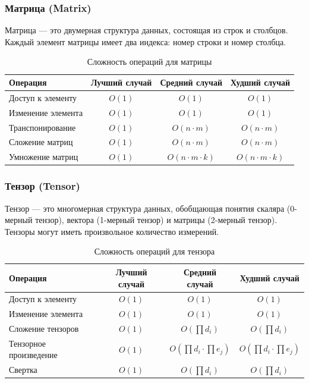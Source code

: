 \documentclass[a4paper,12pt]{article}
\begin{document}
\subsubsection{Матрица (Matrix)}
\label{subsubsec:матрица-matrix}

Матрица --- это двумерная структура данных, состоящая из строк и столбцов. Каждый элемент матрицы имеет два индекса: номер строки и номер столбца.

\begin{table}[H]
    \centering
    \begin{tabular}{|l|c|c|c|}
        \hline
        Операция & Лучший случай & Средний случай & Худший случай \\
        \hline
        Доступ к элементу & $O(1)$ & $O(1)$ & $O(1)$ \\
        \hline
        Изменение элемента & $O(1)$ & $O(1)$ & $O(1)$ \\
        \hline
        Транспонирование & $O(1)$ & $O(n \cdot m)$ & $O(n \cdot m)$ \\
        \hline
        Сложение матриц & $O(1)$ & $O(n \cdot m)$ & $O(n \cdot m)$ \\
        \hline
        Умножение матриц & $O(1)$ & $O(n \cdot m \cdot k)$ & $O(n \cdot m \cdot k)$ \\
        \hline
    \end{tabular}
    \caption{Сложность операций для матрицы}
\end{table}

\subsubsection{Тензор (Tensor)}
\label{subsubsec:тензор-tensor}

Тензор --- это многомерная структура данных, обобщающая понятия скаляра (0-мерный тензор), вектора (1-мерный тензор) и матрицы (2-мерный тензор). Тензоры могут иметь произвольное количество измерений.

\begin{table}[H]
    \centering
    \begin{tabular}{|l|c|c|c|}
        \hline
        Операция & Лучший случай & Средний случай & Худший случай \\
        \hline
        Доступ к элементу & $O(1)$ & $O(1)$ & $O(1)$ \\
        \hline
        Изменение элемента & $O(1)$ & $O(1)$ & $O(1)$ \\
        \hline
        Сложение тензоров & $O(1)$ & $O(\prod d_i)$ & $O(\prod d_i)$ \\
        \hline
        Тензорное произведение & $O(1)$ & $O(\prod d_i \cdot \prod e_j)$ & $O(\prod d_i \cdot \prod e_j)$ \\
        \hline
        Свертка & $O(1)$ & $O(\prod d_i)$ & $O(\prod d_i)$ \\
        \hline
    \end{tabular}
    \caption{Сложность операций для тензора}
\end{table}
\end{document}
